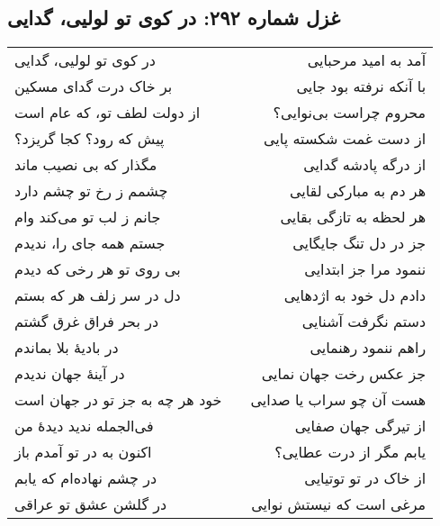 \begin{center}
\section*{غزل شماره ۲۹۲: در کوی تو لولیی، گدایی}
\label{sec:292}
\begin{longtable}{l p{0.5cm} r}
در کوی تو لولیی، گدایی
&&
آمد به امید مرحبایی
\\
بر خاک درت گدای مسکین
&&
با آنکه نرفته بود جایی
\\
از دولت لطف تو، که عام است
&&
محروم چراست بی‌نوایی؟
\\
پیش که رود؟ کجا گریزد؟
&&
از دست غمت شکسته پایی
\\
مگذار که بی نصیب ماند
&&
از درگه پادشه گدایی
\\
چشمم ز رخ تو چشم دارد
&&
هر دم به مبارکی لقایی
\\
جانم ز لب تو می‌کند وام
&&
هر لحظه به تازگی بقایی
\\
جستم همه جای را، ندیدم
&&
جز در دل تنگ جایگایی
\\
بی روی تو هر رخی که دیدم
&&
ننمود مرا جز ابتدایی
\\
دل در سر زلف هر که بستم
&&
دادم دل خود به اژدهایی
\\
در بحر فراق غرق گشتم
&&
دستم نگرفت آشنایی
\\
در بادیهٔ بلا بماندم
&&
راهم ننمود رهنمایی
\\
در آینهٔ جهان ندیدم
&&
جز عکس رخت جهان نمایی
\\
خود هر چه به جز تو در جهان است
&&
هست آن چو سراب یا صدایی
\\
فی‌الجمله ندید دیدهٔ من
&&
از تیرگی جهان صفایی
\\
اکنون به در تو آمدم باز
&&
یابم مگر از درت عطایی؟
\\
در چشم نهاده‌ام که یابم
&&
از خاک در تو توتیایی
\\
در گلشن عشق تو عراقی
&&
مرغی است که نیستش نوایی
\\
\end{longtable}
\end{center}
